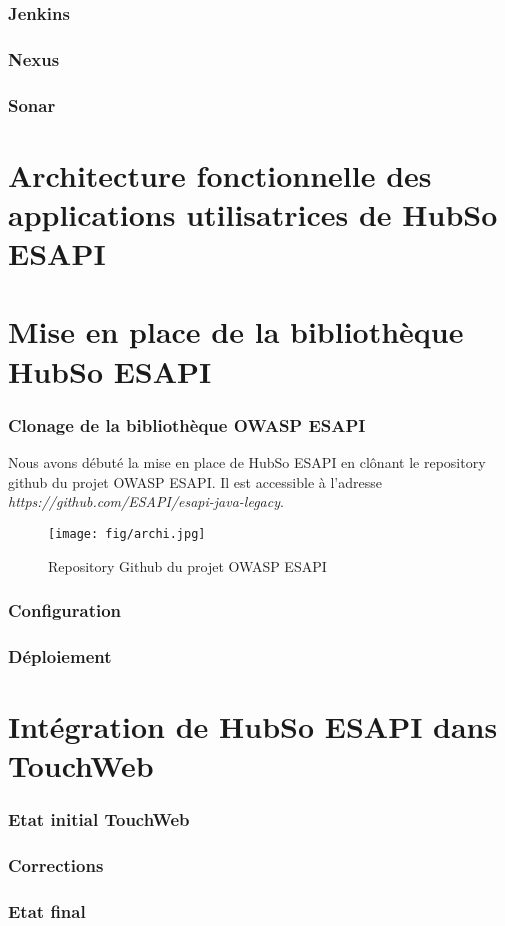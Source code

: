 \subsubsection{Jenkins}
\subsubsection{Nexus}
\subsubsection{Sonar}
\section{Architecture fonctionnelle des applications utilisatrices de HubSo ESAPI}

\section{Mise en place de la bibliothèque HubSo ESAPI}
\subsubsection{Clonage de la bibliothèque OWASP ESAPI}
Nous avons débuté la mise en place de HubSo ESAPI en clônant le repository github du projet OWASP ESAPI. Il est accessible à l'adresse \textit{https://github.com/ESAPI/esapi-java-legacy}.
\begin{figure}[H]
	\centering
	\begin{minipage}{12cm}
		\centering
		\texttt{[image: fig/archi.jpg]}
	\end{minipage}
	\caption{Repository Github du projet OWASP ESAPI}
	\label{fig:architecturefonctionnellehubsoesapi}
\end{figure}
\subsubsection{Configuration}
\subsubsection{Déploiement}
\section{Intégration de HubSo ESAPI dans TouchWeb}
\subsubsection{Etat initial TouchWeb}
\subsubsection{Corrections}
\subsubsection{Etat final}